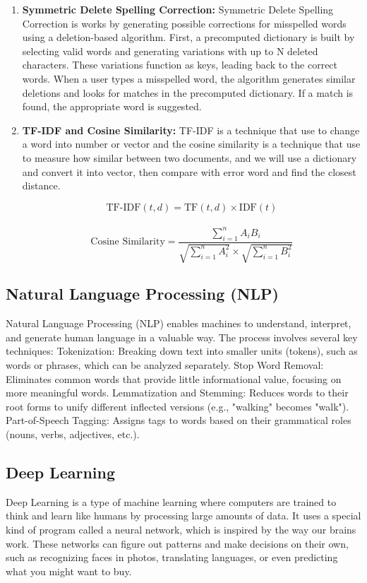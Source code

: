 \documentclass[12pt,oneside,openright,a4paper]{cpe-english-project}
\begin{document}
\begin{enumerate}
	\item \textbf{Symmetric Delete Spelling Correction:} Symmetric Delete Spelling Correction is works by generating possible corrections for misspelled words using a deletion-based algorithm. First, a precomputed dictionary is built by selecting valid words and generating variations with up to N deleted characters. These variations function as keys, leading back to the correct words. When a user types a misspelled word, the algorithm generates similar deletions and looks for matches in the precomputed dictionary. If a match is found, the appropriate word is suggested.
	
	\item \textbf{TF-IDF and Cosine Similarity:} TF-IDF is a technique that use to change a word into number or vector and the cosine similarity is a technique that use to measure how similar between two documents, and we will use a dictionary and convert it into vector, then compare with error word and find the closest distance.
	
\[
\text{TF-IDF}(t, d) = \text{TF}(t, d) \times \text{IDF}(t)
\] \\
	
\[
\text{Cosine Similarity} = \frac{\sum_{i=1}^{n} A_i B_i}{\sqrt{\sum_{i=1}^{n} A_i^2} \times \sqrt{\sum_{i=1}^{n} B_i^2}}
\]

\end{enumerate}

\subsection{Natural Language Processing (NLP)} Natural Language Processing (NLP) enables machines to understand, interpret, and generate human language in a valuable way. The process involves several key techniques: Tokenization: Breaking down text into smaller units (tokens), such as words or phrases, which can be analyzed separately. Stop Word Removal: Eliminates common words that provide little informational value, focusing on more meaningful words. Lemmatization and Stemming: Reduces words to their root forms to unify different inflected versions (e.g., "walking" becomes "walk"). Part-of-Speech Tagging: Assigns tags to words based on their grammatical roles (nouns, verbs, adjectives, etc.).

\subsection{Deep Learning} Deep Learning is a type of machine learning where computers are trained to think and learn like humans by processing large amounts of data. It uses a special kind of program called a neural network, which is inspired by the way our brains work. These networks can figure out patterns and make decisions on their own, such as recognizing faces in photos, translating languages, or even predicting what you might want to buy.
\end{document}
